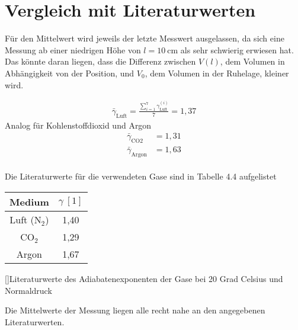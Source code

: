         \section{Vergleich mit Literaturwerten}
        	Für den Mittelwert wird jeweils der letzte Messwert ausgelassen, da sich eine Messung ab einer niedrigen Höhe von $l = 10  ~\si{\centi\metre}$ als sehr schwierig erwiesen hat. Das könnte daran liegen, dass die Differenz zwischen $V(l)$, dem Volumen in Abhängigkeit von der Position, und $V_0$, dem Volumen in der Ruhelage, kleiner wird.
            
            \begin{align*}
             \bar \gamma_{\text{Luft}} = \frac{\sum_{i=1}^7 \gamma_{\text{Luft}}^{(i)}}{7} = 1,37 
            \end{align*}
            Analog für Kohlenstoffdioxid und Argon
            \begin{align*}
             \bar \gamma_{\text{CO2}} &= 1,31 \\
             \bar \gamma_{\text{Argon}} &= 1,63
            \end{align*}
\ \\
    		Die Literaturwerte für die verwendeten Gase sind in Tabelle 4.4 aufgelistet 
            \begin{center}
            	\begin{tabular}{c|c}
            		Medium & $\gamma ~[1]$ \\ \hline
                    Luft (N$_2$) & 1,40 \\
                    CO$_2$ &  1,29\\
                    Argon & 1,67\\
            	\end{tabular}
                []{Literaturwerte des Adiabatenexponenten der Gase bei 20 Grad Celsius und Normaldruck \cite{art:test}}
            \end{center}

            Die Mittelwerte der Messung liegen alle recht nahe an den angegebenen Literaturwerten.

        
        
	\pagebreak